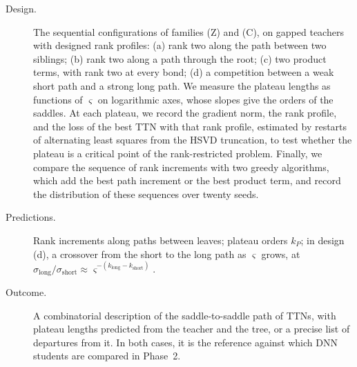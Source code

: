 \documentclass[11pt]{article}
\theoremstyle{definition}
\numberwithin{equation}{section}
\begin{document}
\begin{description}
\item[Design.] The sequential configurations of families (Z) and (C), on gapped teachers with designed rank profiles: (a) rank two along the path between two siblings; (b) rank two along a path through the root; (c) two product terms, with rank two at every bond; (d) a competition between a weak short path and a strong long path. We measure the plateau lengths as functions of $\varsigma$ on logarithmic axes, whose slopes give the orders of the saddles. At each plateau, we record the gradient norm, the rank profile, and the loss of the best TTN with that rank profile, estimated by restarts of alternating least squares from the HSVD truncation, to test whether the plateau is a critical point of the rank-restricted problem. Finally, we compare the sequence of rank increments with two greedy algorithms, which add the best path increment or the best product term, and record the distribution of these sequences over twenty seeds.
\item[Predictions.] Rank increments along paths between leaves; plateau orders $k_P$; in design (d), a crossover from the short to the long path as $\varsigma$ grows, at $\sigma_{\mathrm{long}}/\sigma_{\mathrm{short}}\approx\varsigma^{-(k_{\mathrm{long}}-k_{\mathrm{short}})}$.
\item[Outcome.] A combinatorial description of the saddle-to-saddle path of TTNs, with plateau lengths predicted from the teacher and the tree, or a precise list of departures from it. In both cases, it is the reference against which DNN students are compared in Phase~2.
\end{description}
\end{document}
